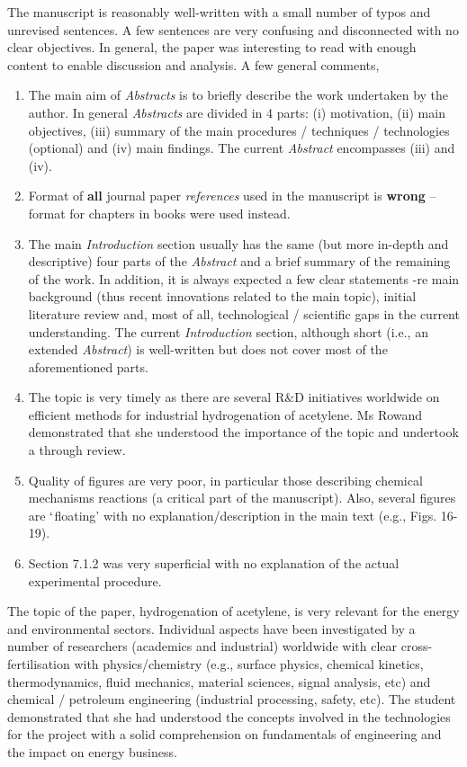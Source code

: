 \documentclass[14pt,twoside]{report}
\begin{document}
The manuscript is reasonably well-written with a small number of typos and unrevised sentences. A few sentences are very confusing and disconnected with no clear objectives. In general, the paper was interesting to read with enough content to enable discussion and analysis. A few general comments,
\begin{enumerate}
\item The main aim of {\it Abstracts} is to briefly describe the work undertaken by the author. In general {\it Abstracts} are divided in 4 parts: (i) motivation, (ii) main objectives, (iii) summary of the main procedures / techniques / technologies (optional) and (iv) main findings. The current {\it Abstract} encompasses (iii) and (iv).
%
\item Format of {\bf all} journal paper {\it references} used in the manuscript is {\bf wrong} -- format for chapters in books were used instead. 
%
\item The main {\it Introduction} section usually has the same (but more in-depth and descriptive) four parts of the {\it Abstract} and a brief summary of the remaining of the work. In addition, it is always expected a few clear statements -re main background (thus recent innovations related to the main topic), initial literature review and, most of all, technological / scientific gaps in the current understanding. The current {\it Introduction} section, although short (i.e., an extended {\it Abstract}) is well-written but does not cover most of the aforementioned parts. 
%
\item The topic is very timely as there are several R$\&$D initiatives worldwide on efficient methods for industrial hydrogenation of acetylene. Ms Rowand demonstrated that she understood the importance of the topic and undertook a through review.
%
\item Quality of figures are very poor, in particular those describing chemical mechanisms reactions (a critical part of the manuscript). Also, several figures are $\lq$floating' with no explanation/description in the main text (e.g., Figs. 16-19).
%
\item Section 7.1.2 was very superficial with no explanation of the actual experimental procedure.
\end{enumerate}

The topic of the paper, hydrogenation of acetylene, is very relevant for the energy and environmental sectors. Individual aspects have been investigated by a number of researchers (academics and industrial) worldwide with clear cross-fertilisation with physics/chemistry (e.g., surface physics, chemical kinetics, thermodynamics, fluid mechanics, material sciences, signal analysis, etc) and chemical / petroleum engineering (industrial processing, safety, etc). The student demonstrated that she had understood the concepts involved in the technologies for the project with a solid comprehension on fundamentals of engineering and the impact on energy business.    
\end{document}
